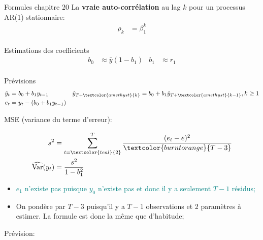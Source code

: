 \documentclass[12pt, titlepage, french]{report}
\begin{document}
\begin{FORMULA_SUMM}{Formules chapitre 20}
La \textbf{vraie auto-corrélation} au lag $k$ pour un processus AR(1) stationnaire:
\begin{align*}
	\rho_{k}	
		&=	\beta_{1}^{k}	\\
\end{align*}

Estimations des coefficients
\begin{align*}
	b_{0}	
		&\approx		\bar{y} (1 - b_{1})	&
	b_{1}	
		&\approx		r_{1}	\\
\end{align*}

Prévisions
\begin{align*}
	\hat{y}_{t}	
		&=	b_{0} + b_{1} y_{t - 1}	&
	\hat{y}_{T + \textcolor{amethyst}{k}}
		&=	b_{0} + b_{1} \hat{y}_{T + \textcolor{amethyst}{k - 1}}, k \ge 1	\\
	e_{t}	
		&=	y_{t} - (b_{0} + b_{1} y_{t - 1})	\\
\end{align*}

MSE (variance du terme d'erreur):

\begin{minipage}[ht]{0.5\linewidth}
\begin{align*}
	s^{2}
		&=	\sum_{t = \textcolor{teal}{2}}^{T}	\frac{(e_{t} - \bar{e})^{2}}{\textcolor{burntorange}{T - 3}}	\\
	\widehat{\text{Var}}(y_{t})
		&=	\frac{s^{2}}{1 - b_{1}^{2}}
\end{align*}
\end{minipage}
\begin{minipage}[ht]{0.5\linewidth}
\begin{itemize}
	\item	\textcolor{teal}{$e_{1}$ n'existe pas puisque $y_{0}$ n'existe pas et donc il y a seulement $T - 1$ résidus;}
	\item	\textcolor{burntorange}{On pondère par $T - 3$ puisqu'il y a $T - 1$ observations et 2 paramètres à estimer. La formule est donc la même que d'habitude;}
\end{itemize}
\end{minipage}

Prévision:


\end{FORMULA_SUMM}
\end{document}
